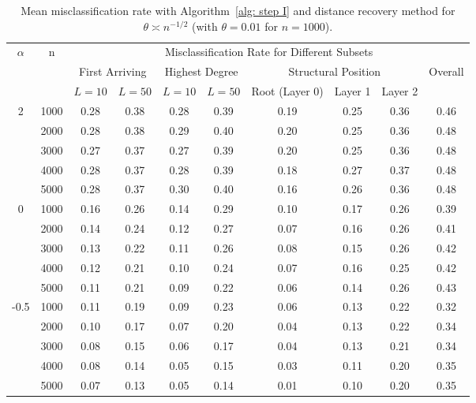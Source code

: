\documentclass[twoside,11pt]{article}
\theoremstyle{remark}
\begin{document}
\begin{table}[tbp]
\setlength{\tabcolsep}{3.5pt}

\centering

{
\begin{tabular}{c|c|cc|cc|ccc|c}
\hline
\hline
\multirow{3}{*}{$\alpha$} & \multirow{3}{*}{n}
& \multicolumn{8}{c}{Misclassification Rate for Different Subsets} \\
\cline{3-10}
& 
& \multicolumn{2}{c|}{First Arriving}
& \multicolumn{2}{c|}{Highest Degree}
& \multicolumn{3}{c|}{Structural Position}
& \multirow{2}{*}{Overall} \\
\cline{3-9}
& 
& $L=10$ & $L=50$
& $L=10$ & $L=50$
& Root (Layer 0) & Layer 1 & Layer 2
& \\
\hline
\multirow{5}{*}{2}
& 1000 & 0.28 & 0.38 & 0.28 & 0.39 & 0.19 & 0.25 & 0.36 & 0.46 \\
& 2000 & 0.28 & 0.38 & 0.29 & 0.40 & 0.20 & 0.25 & 0.36 & 0.48 \\
& 3000 & 0.27 & 0.37 & 0.27 & 0.39 & 0.20 & 0.25 & 0.36 & 0.48 \\
& 4000 & 0.28 & 0.37 & 0.28 & 0.39 & 0.18 & 0.27 & 0.37 & 0.48 \\
& 5000 & 0.28 & 0.37 & 0.30 & 0.40 & 0.16 & 0.26 & 0.36 & 0.48 \\
\hline
\multirow{5}{*}{0}
& 1000 & 0.16 & 0.26 & 0.14 & 0.29 & 0.10 & 0.17 & 0.26 & 0.39 \\
& 2000 & 0.14 & 0.24 & 0.12 & 0.27 & 0.07 & 0.16 & 0.26 & 0.41 \\
& 3000 & 0.13 & 0.22 & 0.11 & 0.26 & 0.08 & 0.15 & 0.26 & 0.42 \\
& 4000 & 0.12 & 0.21 & 0.10 & 0.24 & 0.07 & 0.16 & 0.25 & 0.42 \\
& 5000 & 0.11 & 0.21 & 0.09 & 0.22 & 0.06 & 0.14 & 0.26 & 0.43 \\
\hline
\multirow{5}{*}{-0.5}
& 1000 & 0.11 & 0.19 & 0.09 & 0.23 & 0.06 & 0.13 & 0.22 & 0.32 \\
& 2000 & 0.10 & 0.17 & 0.07 & 0.20 & 0.04 & 0.13 & 0.22 & 0.34 \\
& 3000 & 0.08 & 0.15 & 0.06 & 0.17 & 0.04 & 0.13 & 0.21 & 0.34 \\
& 4000 & 0.08 & 0.14 & 0.05 & 0.15 & 0.03 & 0.11 & 0.20 & 0.35 \\
& 5000 & 0.07 & 0.13 & 0.05 & 0.14 & 0.01 & 0.10 & 0.20 & 0.35 \\
\hline
\hline
\end{tabular}
}


\caption{Mean misclassification rate with Algorithm~\ref{alg: step I} and distance recovery method for $\theta \asymp n^{-1/2}$ (with $\theta=0.01$ for $n=1000$).}
\label{tab:mean_error_scale_n12}
\end{table}
\end{document}
